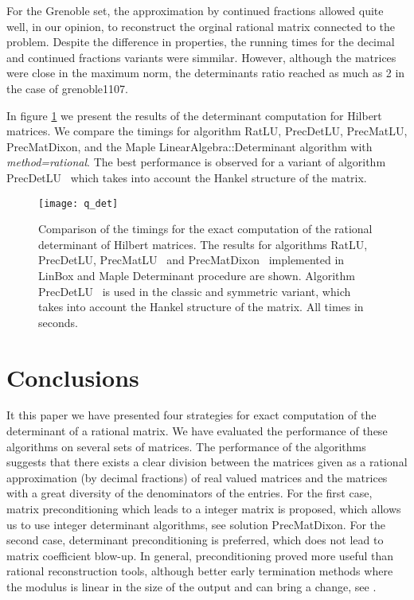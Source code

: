 \documentclass{acm_proc_article-sp}   \usepackage{graphicx,url}
\newcommand{\algrdRat}{RatLU}
\newcommand{\algrdDet}{PrecDetLU}
\newcommand{\algrdMat}{PrecMatLU}
\newcommand{\algrdDixon}{PrecMatDixon}
\begin{document}
For the Grenoble set, the approximation by continued fractions allowed quite well, in our opinion, to reconstruct the orginal rational matrix connected to the problem. Despite the difference in properties, the running times for the decimal and continued fractions variants were simmilar. However, although the matrices were close in the maximum norm, the determinants ratio reached as much as 2 in the case of grenoble1107.   


In figure \ref{fig:hil} we present the results of the determinant computation for Hilbert matrices. We compare the timings for algorithm \algrdRat,  \algrdDet, \algrdMat, \algrdDixon, and the Maple LinearAlgebra::Determinant algorithm with {\em method=rational}. The best performance is observed for a variant of algorithm \algrdDet~ which takes into account the Hankel structure of the matrix.

\begin{figure}\label{fig:hil}
\centering
\texttt{[image: q\_det]}
\caption{Comparison of the timings for the exact computation of the
rational determinant of Hilbert matrices. The results for algorithms
\algrdRat, \algrdDet, \algrdMat~ and \algrdDixon~ implemented in
LinBox and Maple Determinant procedure are shown. Algorithm
\algrdDet~ is used in the classic and symmetric variant, which takes
into account the Hankel structure of the matrix. All times in
seconds. }
\end{figure}







\section{Conclusions}\label{sec:ccl}

It this paper we have presented four strategies for exact computation of the determinant of a rational matrix. We have evaluated the performance of these algorithms on several sets of matrices. The performance of the algorithms suggests that there exists a clear division between the matrices given as a rational approximation (by decimal fractions) of real valued matrices and the matrices with a great diversity of the denominators of the entries. For the first case, matrix preconditioning which leads to a integer matrix is proposed, which allows us to use integer determinant algorithms, see solution \algrdDixon. For the second case, determinant preconditioning is preferred, which does not lead to matrix coefficient blow-up. In general, preconditioning proved more useful than rational reconstruction tools, although better early termination methods where the modulus  is linear in the size of the output  and  can bring a change, see \cite{kho-mon:2006,ol-sto:2006}.
\end{document}
